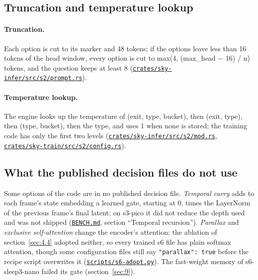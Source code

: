 \documentclass[10pt]{article}
\begin{document}
\subsection{Truncation and temperature lookup}\label{sec:A.2}

\paragraph{Truncation.} Each option is cut to its marker and 48 tokens; if the options leave less than 16 tokens of the head window, every option is cut to max(4, (max\_head $-$ 16) / n) tokens, and the question keeps at least 8 (\href{https://github.com/maxgfr/skycmd/blob/main/crates/sky-infer/src/s2/prompt.rs}{\texttt{crates/\allowbreak{}sky-infer/\allowbreak{}src/\allowbreak{}s2/\allowbreak{}prompt.rs}}).

\paragraph{Temperature lookup.} The engine looks up the temperature of (exit, type, bucket), then (exit, type), then (type, bucket), then the type, and uses 1 when none is stored; the training code has only the first two levels (\href{https://github.com/maxgfr/skycmd/blob/main/crates/sky-infer/src/s2/mod.rs}{\texttt{crates/\allowbreak{}sky-infer/\allowbreak{}src/\allowbreak{}s2/\allowbreak{}mod.rs}}, \href{https://github.com/maxgfr/skycmd/blob/main/crates/sky-train/src/s2/config.rs}{\texttt{crates/\allowbreak{}sky-train/\allowbreak{}src/\allowbreak{}s2/\allowbreak{}config.rs}}).

\subsection{What the published decision files do not use}\label{sec:A.3}

Some options of the code are in no published decision file. \emph{Temporal carry} adds to each frame's state embedding a learned gate, starting at 0, times the LayerNorm of the previous frame's final latent; on s3-pico it did not reduce the depth used and was not shipped (\href{https://github.com/maxgfr/skycmd/blob/main/BENCH.md}{\texttt{BENCH.md}}, section ``Temporal recursion''). \emph{Parallax} and \emph{exclusive self-attention} change the encoder's attention; the ablation of section~\ref{sec:4.4} adopted neither, so every trained s6 file has plain softmax attention, though some configuration files still say \texttt{"parallax": true} before the recipe script overwrites it (\href{https://github.com/maxgfr/skycmd/blob/main/scripts/s6-adopt.py}{\texttt{scripts/\allowbreak{}s6-adopt.py}}). The fast-weight memory of s6-sleep3-nano failed its gate (section~\ref{sec:9}).
\end{document}
